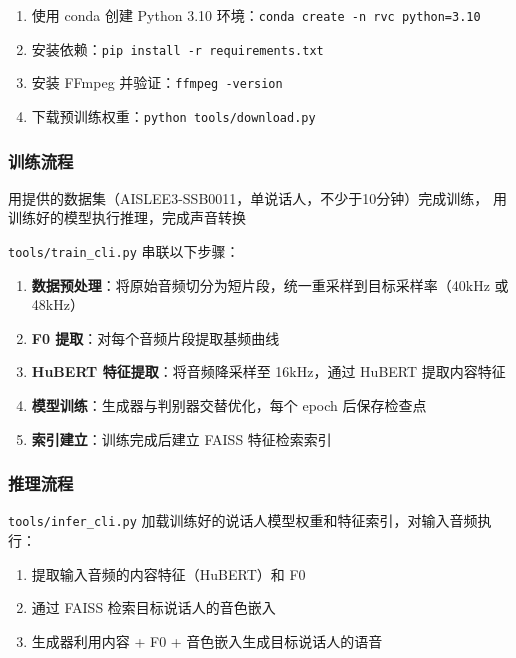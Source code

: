 \documentclass[
  english,
  letterpaper,
  DIV=11,
  numbers=noendperiod]{scrartcl}
\providecommand{\tightlist}{%
  \setlength{\itemsep}{0pt}\setlength{\parskip}{0pt}}
\begin{document}
\begin{enumerate}
\def\labelenumi{\arabic{enumi}.}
\tightlist
\item
  使用 conda 创建 Python 3.10
  环境：\texttt{conda\ create\ -n\ rvc\ python=3.10}
\item
  安装依赖：\texttt{pip\ install\ -r\ requirements.txt}
\item
  安装 FFmpeg 并验证：\texttt{ffmpeg\ -version}
\item
  下载预训练权重：\texttt{python\ tools/download.py}
\end{enumerate}

\subsubsection{训练流程}\label{ux8badux7ec3ux6d41ux7a0b}

用提供的数据集（AISLEE3-SSB0011，单说话人，不少于10分钟）完成训练，
用训练好的模型执行推理，完成声音转换

\texttt{tools/train\_cli.py} 串联以下步骤：

\begin{enumerate}
\def\labelenumi{\arabic{enumi}.}
\tightlist
\item
  \textbf{数据预处理}：将原始音频切分为短片段，统一重采样到目标采样率（40kHz
  或 48kHz）
\item
  \textbf{F0 提取}：对每个音频片段提取基频曲线
\item
  \textbf{HuBERT 特征提取}：将音频降采样至 16kHz，通过 HuBERT
  提取内容特征
\item
  \textbf{模型训练}：生成器与判别器交替优化，每个 epoch 后保存检查点
\item
  \textbf{索引建立}：训练完成后建立 FAISS 特征检索索引
\end{enumerate}

\subsubsection{推理流程}\label{ux63a8ux7406ux6d41ux7a0b}

\texttt{tools/infer\_cli.py}
加载训练好的说话人模型权重和特征索引，对输入音频执行：

\begin{enumerate}
\def\labelenumi{\arabic{enumi}.}
\tightlist
\item
  提取输入音频的内容特征（HuBERT）和 F0
\item
  通过 FAISS 检索目标说话人的音色嵌入
\item
  生成器利用内容 + F0 + 音色嵌入生成目标说话人的语音
\end{enumerate}
\end{document}
